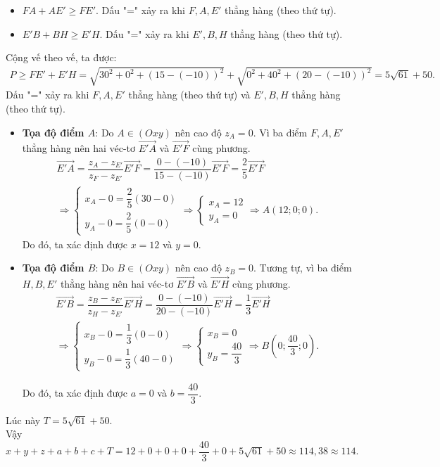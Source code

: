 \begin{ex}
{		\begin{itemize}
			\item $FA + AE' \ge FE'$. Dấu "=" xảy ra khi $F, A, E'$ thẳng hàng (theo thứ tự).
			\item $E'B + BH \ge E'H$. Dấu "=" xảy ra khi $E', B, H$ thẳng hàng (theo thứ tự).
		\end{itemize}
		Cộng vế theo vế, ta được:
		\begin{eqnarray*}
			 P \ge FE' + E'H = \sqrt{30^2 + 0^2 + (15 - (-10))^2} + \sqrt{0^2 + 40^2 + (20 - (-10))^2} = 5\sqrt{61} + 50.
		\end{eqnarray*}
		Dấu "=" xảy ra khi $F, A, E'$ thẳng hàng (theo thứ tự) và $E', B, H$ thẳng hàng (theo thứ tự).\\
		\begin{itemize}
			\item \textbf{Tọa độ điểm $A$}: Do $A \in (Oxy)$ nên cao độ $z_A = 0$. Vì ba điểm $F, A, E'$ thẳng hàng nên hai véc-tơ $\overrightarrow{E'A}$ và $\overrightarrow{E'F}$ cùng phương. 
			\begin{eqnarray*}
				\overrightarrow{E'A} = \dfrac{z_A - z_{E'}}{z_F - z_{E'}}\overrightarrow{E'F} = \dfrac{0 - (-10)}{15 - (-10)}\overrightarrow{E'F} = \dfrac{2}{5}\overrightarrow{E'F} \\
				\Rightarrow \begin{cases} x_A - 0 = \dfrac{2}{5}(30 - 0) \\ y_A - 0 = \dfrac{2}{5}(0 - 0) \end{cases} \Rightarrow \begin{cases} x_A = 12 \\ y_A = 0 \end{cases} \Rightarrow A(12; 0; 0).&
			\end{eqnarray*}
			Do đó, ta xác định được $x = 12$ và $y = 0$.
			\item \textbf{Tọa độ điểm $B$}: Do $B \in (Oxy)$ nên cao độ $z_B = 0$. Tương tự, vì ba điểm $H, B, E'$ thẳng hàng nên hai véc-tơ $\overrightarrow{E'B}$ và $\overrightarrow{E'H}$ cùng phương.
			\begin{eqnarray*}
				\overrightarrow{E'B} = \dfrac{z_B - z_{E'}}{z_H - z_{E'}}\overrightarrow{E'H} = \dfrac{0 - (-10)}{20 - (-10)}\overrightarrow{E'H} = \dfrac{1}{3}\overrightarrow{E'H} \\
				\Rightarrow \begin{cases} x_B - 0 = \dfrac{1}{3}(0 - 0) \\ y_B - 0 = \dfrac{1}{3}(40 - 0) \end{cases} \Rightarrow \begin{cases} x_B = 0 \\ y_B = \dfrac{40}{3} \end{cases} \Rightarrow B\left(0; \dfrac{40}{3}; 0\right).&
			\end{eqnarray*}
			
			Do đó, ta xác định được $a = 0$ và $b = \dfrac{40}{3}$.
		\end{itemize}
		Lúc này $T = 5\sqrt{61} + 50$. \\
		Vậy $x + y + z + a + b + c + T = 12 + 0 + 0 + 0 + \dfrac{40}{3} + 0 + 5\sqrt{61} + 50 \approx 114{,}38 \approx 114$.
		
	}
\end{ex}

